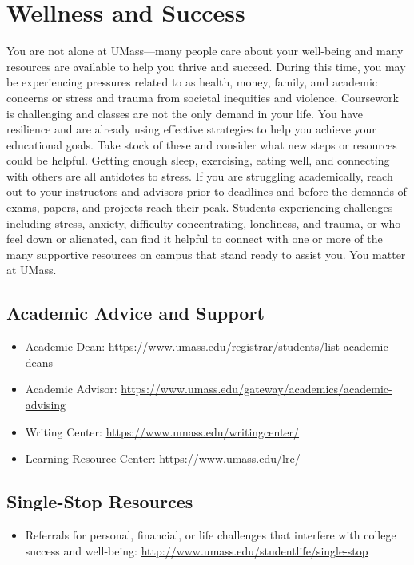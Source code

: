 \documentclass[11pt,twoside]{article}
\numberwithin{equation}{section}
\newcommand{\?}{\stackrel{?}{=}}
\begin{document}
\section{Wellness and Success}
You are not alone at UMass---many people care about your well-being and many resources are available to help you thrive and succeed.
During this time, you may be experiencing pressures related to as health, money, family, and academic concerns or stress and trauma from societal inequities and violence.
Coursework is challenging and classes are not the only demand in your life. 
You have resilience and are already using effective strategies to help you achieve your educational goals.
Take stock of these and consider what new steps or resources could be helpful.
Getting enough sleep, exercising, eating well, and connecting with others are all antidotes to stress.
If you are struggling academically, reach out to your instructors and advisors prior to deadlines and before the demands of exams, papers, and projects reach their peak. 
Students experiencing challenges including stress, anxiety, difficulty concentrating, loneliness, and trauma, or who feel down or alienated, can find it helpful to connect with one or more of the many supportive resources on campus that stand ready to assist you. You matter at UMass. 

\subsection{Academic Advice and Support}
\begin{itemize}
\item Academic Dean: \url{https://www.umass.edu/registrar/students/list-academic-deans}
\item  Academic Advisor: \url{https://www.umass.edu/gateway/academics/academic-advising}
\item  Writing Center: \url{https://www.umass.edu/writingcenter/}
\item  Learning Resource Center: \url{https://www.umass.edu/lrc/}
\end{itemize}

\subsection{Single-Stop Resources}
\begin{itemize}
\item  Referrals for personal, financial, or life challenges that interfere with college success and well-being: \url{http://www.umass.edu/studentlife/single-stop}

   \end{itemize}
\end{document}
